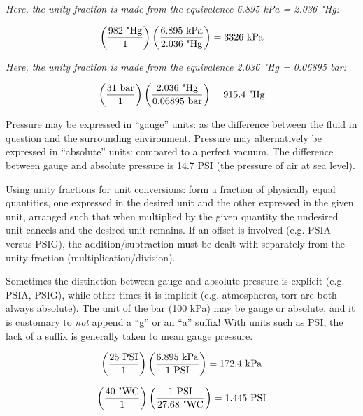 \vskip 20pt

\noindent
{\it Here, the unity fraction is made from the equivalence 6.895 kPa = 2.036 "Hg:}

$$\left(982 \hbox{ "Hg} \over 1 \right) \left(6.895 \hbox{ kPa} \over 2.036 \hbox{ "Hg}\right) = 3326 \hbox{ kPa} $$

\vskip 20pt

\noindent
{\it Here, the unity fraction is made from the equivalence 2.036 "Hg = 0.06895 bar:}

$$\left(31 \hbox{ bar} \over 1 \right) \left(2.036 \hbox{ "Hg} \over 0.06895 \hbox{ bar}\right) = 915.4 \hbox{ "Hg} $$







Pressure may be expressed in ``gauge'' units: as the difference between the fluid in question and the surrounding environment.  Pressure may alternatively be expressed in ``absolute'' units: compared to a perfect vacuum.  The difference between gauge and absolute pressure is 14.7 PSI (the pressure of air at sea level).

\vskip 10pt

Using unity fractions for unit conversions: form a fraction of physically equal quantities, one expressed in the desired unit and the other expressed in the given unit, arranged such that when multiplied by the given quantity the undesired unit cancels and the desired unit remains.  If an offset is involved (e.g. PSIA versus PSIG), the addition/subtraction must be dealt with separately from the unity fraction (multiplication/division).

\vskip 10pt

Sometimes the distinction between gauge and absolute pressure is explicit (e.g. PSIA, PSIG), while other times it is implicit (e.g. atmospheres, torr are both always absolute).  The unit of the bar (100 kPa) may be gauge or absolute, and it is customary to {\it not} append a ``g'' or an ``a'' suffix!  With units such as PSI, the lack of a suffix is generally taken to mean gauge pressure.








$$\left(25 \hbox{ PSI} \over 1 \right) \left(6.895 \hbox{ kPa} \over 1 \hbox{ PSI}\right) = 172.4 \hbox{ kPa} $$

$$\left(40 \hbox{ "WC} \over 1 \right) \left(1 \hbox{ PSI} \over 27.68 \hbox{ "WC}\right) = 1.445 \hbox{ PSI} $$

